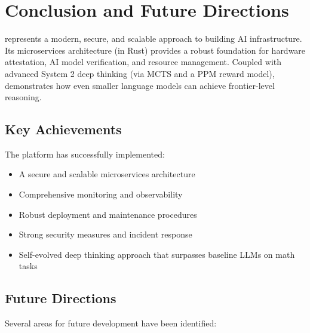 \section{Conclusion and Future Directions}

\sysname{} represents a modern, secure, and scalable approach to building AI infrastructure. Its microservices architecture (in Rust) provides a robust foundation for hardware attestation, AI model verification, and resource management. Coupled with advanced System 2 deep thinking (via MCTS and a PPM reward model), \sysname{} demonstrates how even smaller language models can achieve frontier-level reasoning.

\subsection{Key Achievements}

The platform has successfully implemented:

\begin{itemize}
    \item A secure and scalable microservices architecture
    \item Comprehensive monitoring and observability
    \item Robust deployment and maintenance procedures
    \item Strong security measures and incident response
    \item Self-evolved deep thinking approach that surpasses baseline LLMs on math tasks
\end{itemize}

\subsection{Future Directions}

Several areas for future development have been identified:


